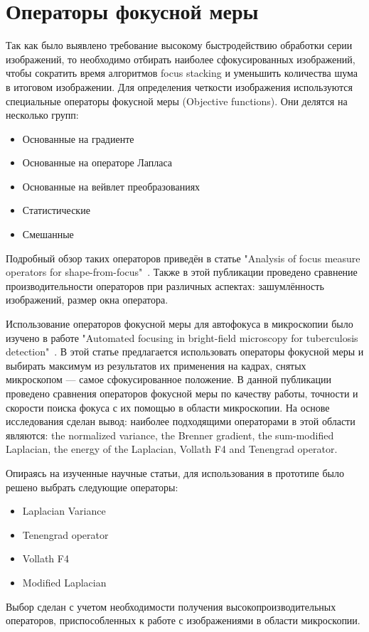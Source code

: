 \documentclass[14pt]{matmex-diploma-custom}
\begin{document}
\section{Операторы фокусной меры}
Так как было выявлено требование высокому быстродействию обработки серии изображений, то необходимо отбирать наиболее сфокусированных изображений, чтобы сократить время алгоритмов focus stacking и уменьшить количества шума в итоговом изображении. Для определения четкости изображения используются специальные операторы фокусной меры (Objective functions). Они делятся на несколько групп:
\begin{itemize}
    \item Основанные на градиенте
    \item Основанные на операторе Лапласа
    \item Основанные на вейвлет преобразованиях
    \item Статистические
    \item Смешанные
\end{itemize}

Подробный обзор таких операторов приведён в статье "Analysis of focus measure operators for shape-from-focus"~\cite{MeasureOperators}. Также в этой публикации проведено сравнение производительности операторов при различных аспектах: зашумлённость изображений, размер окна оператора. 

Использование операторов фокусной меры для автофокуса в микроскопии было изучено в работе "Automated focusing in bright-field microscopy for tuberculosis detection"~\cite{BestOperators}. В этой статье предлагается использовать операторы фокусной меры и выбирать максимум из результатов их применения на кадрах, снятых микроскопом --- самое сфокусированное положение. В данной публикации проведено сравнения операторов фокусной меры по качеству работы, точности и скорости поиска фокуса с их помощью в области микроскопии. На основе исследования сделан вывод: наиболее подходящими операторами в этой области являются: the normalized variance, the Brenner gradient, the sum-modified Laplacian, the energy of the Laplacian, Vollath F4 and Tenengrad operator.

Опираясь на изученные научные статьи, для использования в прототипе было решено выбрать следующие операторы:
\begin{itemize}
    \item Laplacian Variance 
    \item Tenengrad operator
    \item Vollath F4
    \item Modified Laplacian
\end{itemize}
Выбор сделан с учетом необходимости получения высокопроизводительных операторов, приспособленных к работе с изображениями в области микроскопии.
\end{document}
